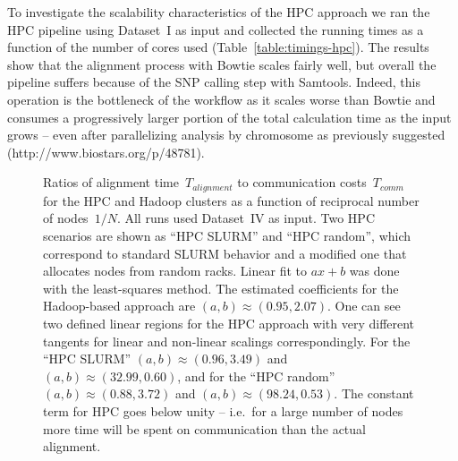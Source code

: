 \documentclass{bioinfo}
\begin{document}
To investigate the scalability characteristics of the HPC approach we ran the
HPC pipeline using Dataset~I as input and collected the running times as a
function of the number of cores used (Table~\ref{table:timings-hpc}). The results show that the
alignment process with Bowtie scales fairly well, but overall the pipeline
suffers because of the SNP calling step with Samtools. Indeed, this operation
is the bottleneck of the workflow as it scales
worse than Bowtie and consumes a progressively larger portion of the total
calculation time as the input grows -- even after parallelizing analysis by
chromosome as previously suggested (http://www.biostars.org/p/48781).


\begin{figure}[!hb]
	\small
	
	\normalsize
\caption{%
	Ratios of alignment time~$T_{alignment}$ to communication costs~$T_{comm}$ for
	the HPC and Hadoop clusters as a function of reciprocal number of nodes~$1/N$.
	All runs used Dataset~IV as input. Two HPC scenarios are shown as ``HPC
	SLURM'' and ``HPC random'', which correspond to standard SLURM behavior and a
	modified one that allocates nodes from random racks.  Linear fit to $ax+b$ was
	done with the least-squares method.  The estimated coefficients for the
	Hadoop-based approach are $(a,b)\approx(0.95,2.07)$.  One can see two defined
	linear regions for the HPC approach with very different tangents for linear
	and non-linear scalings correspondingly.  For  the ``HPC SLURM'' $(a,b)\approx
	(0.96, 3.49)$ and $(a,b)\approx (32.99, 0.60)$, and for  the ``HPC random''
	$(a,b)\approx (0.88, 3.72)$ and $(a,b)\approx (98.24, 0.53)$.  The constant
	term for HPC goes below unity -- i.e.\ for a large number of nodes more time
	will be spent on communication than the actual alignment. 
	}
	\label{fig:fig3}
\end{figure}



\end{document}

